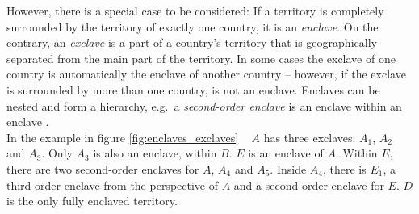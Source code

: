 \vspace{-0.5em}
\begin{minipage}[t]{0.60\textwidth}

However, there is a special case to be considered:
If a territory is completely surrounded by the territory of exactly one country, it is an \emph{enclave}. On the contrary, an \emph{exclave} is a part of a country's territory that is geographically separated from the main part of the territory. In some cases the exclave of one country is automatically the enclave of another country -- however, if the exclave is surrounded by more than one country, is not an enclave. Enclaves can be nested and form a hierarchy, e.g.\ a \emph{second-order enclave} is an enclave within an enclave
\cite{enclavesexclaves}. \\[-0.6em]

In the example in figure \ref{fig:enclaves_exclaves} ~ $A$ has three exclaves: $A_1$, $A_2$ and $A_3$. Only $A_3$ is also an enclave, within $B$. $E$ is an enclave of $A$. Within $E$, there are two second-order enclaves for $A$, $A_4$ and $A_5$. Inside $A_4$, there is $E_1$, a third-order enclave from the perspective of $A$ and a second-order enclave for $E$. $D$ is the only fully enclaved territory.

\end{minipage}             %
\hspace{0.05\textwidth}    %

